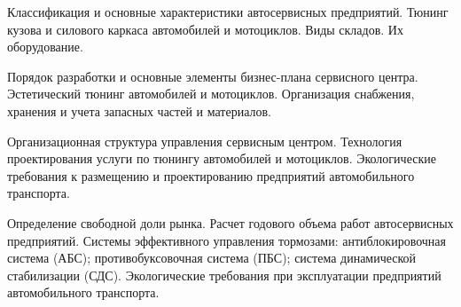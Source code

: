 \documentclass[
	11pt,
	a4paper,
	]
	{article}
\begin{document}
\bigskip

\noindent{} 
	{
		Классификация и основные характеристики автосервисных предприятий.
	}{
		Тюнинг кузова и силового каркаса автомобилей и мотоциклов.
	}{
		Виды складов. Их оборудование.
	}

\bigskip

\noindent{} 
	{
		Порядок разработки и основные элементы бизнес-плана сервисного центра.
	}{
		Эстетический тюнинг автомобилей и мотоциклов.
	}{
		Организация снабжения, хранения и учета запасных частей и материалов.
	}

\bigskip

\noindent{} 
	{
		Организационная структура управления сервисным центром.
	}{
		Технология проектирования услуги по тюнингу автомобилей и мотоциклов.
	}{
		Экологические требования к размещению и проектированию предприятий автомобильного транспорта.
	}

\bigskip

\noindent{} 
	{
		Определение свободной доли рынка. Расчет годового объема работ автосервисных предприятий.
	}{
		Системы эффективного управления тормозами: антиблокировочная система (АБС); противобуксовочная система (ПБС); система динамической стабилизации (СДС).
	}{
		Экологические требования при эксплуатации предприятий автомобильного транспорта.
	}

\bigskip
\end{document}
